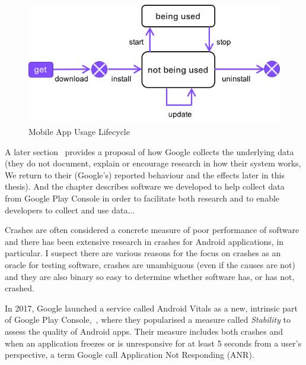 \begin{figure}[htbp!]
    \centering
    \includegraphics[width=12cm]{images/mobile_app_usage_lifecycle.png}
    \caption{Mobile App Usage Lifecycle}
    \label{fig:mobile_app_usage_lifecycle}
\end{figure}

A later section~\href{sec:platform-level-analytics}{\emph{}} provides a proposal of how Google collects the underlying data (they do not document, explain or encourage research in how their system works, We return to their (Google's) reported behaviour and the effects later in this thesis). %
And the chapter \href{app:software-contributions}{\emph{}} describes software we developed to help collect data from Google Play Console in order to facilitate both research and to enable developers to collect and use data...

Crashes are often considered a concrete measure of poor performance of software and there has been extensive research in crashes for Android applications, in particular. I suspect there are various reasons for the focus on crashes as an oracle for testing software, crashes are unambiguous (even if the causes are not) and they are also binary so easy to determine whether software has, or has not, crashed. 

In 2017, Google launched a service called Android Vitals as a new, intrinsic part of Google Play Console,~\cite{googblogs_I_O_2017_everything_new_in_the_google_play_console}, where they popularised a measure called \emph{Stability} to assess the quality of Android apps. Their measure includes both crashes and when an application freezes or is unresponsive for at least 5 seconds from a user's perspective, a term Google call Application Not Responding (ANR).


